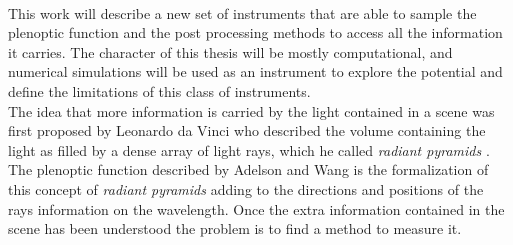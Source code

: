 \\
This work will describe a new set of instruments that are able to sample the plenoptic function and the post processing methods to access all the information it carries. The character of this thesis will be mostly computational, and numerical simulations will be used as an instrument to explore the potential and define the limitations of this class of instruments.
\\
 The idea that more information is carried by the light contained in a scene was first proposed by Leonardo da Vinci who described the volume containing the light as filled by a dense array of light rays, which he called \textit{radiant pyramids} \cite{adelson1991plenoptic}. The plenoptic function described by Adelson and Wang \cite{adelson1991plenoptic} is the formalization of this concept of \textit{radiant pyramids} adding to the directions and positions of the rays information on the wavelength. Once the extra information contained in the scene has been understood the problem is to find a method to measure it. \\
